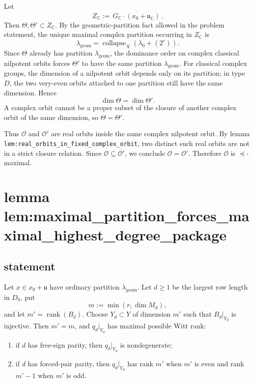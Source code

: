 \documentclass[
]{article}
\providecommand{\tightlist}{%
  \setlength{\itemsep}{0pt}\setlength{\parskip}{0pt}}
\begin{document}
Let \[
Z_{\mathbb C}:=\overline{\,G_{\mathbb C}\cdot(x_0+\mathfrak u_{\mathbb C})\,}.
\] Then \(\Theta,\Theta'\subset Z_{\mathbb C}\). By the
geometric-partition fact allowed in the problem statement, the unique
maximal complex partition occurring in \(Z_{\mathbb C}\) is \[
\lambda_{\mathrm{geom}}=\operatorname{collapse}_X(\lambda_0+(2^r)).
\] Since \(\Theta\) already has partition \(\lambda_{\mathrm{geom}}\),
the dominance order on complex classical nilpotent orbits forces
\(\Theta'\) to have the same partition \(\lambda_{\mathrm{geom}}\). For
classical complex groups, the dimension of a nilpotent orbit depends
only on its partition; in type \(D\), the two very-even orbits attached
to one partition still have the same dimension. Hence \[
\dim \Theta=\dim \Theta'.
\] A complex orbit cannot be a proper subset of the closure of another
complex orbit of the same dimension, so \(\Theta=\Theta'\).

Thus \(\mathcal O\) and \(\mathcal O'\) are real orbits inside the same
complex nilpotent orbit. By lemma
\texttt{lem:real\_orbits\_in\_fixed\_complex\_orbit}, two distinct such
real orbits are not in a strict closure relation. Since
\(\mathcal O\subseteq \overline{\mathcal O'}\), we conclude
\(\mathcal O=\mathcal O'\). Therefore \(\mathcal O\) is
\(\preceq\)-maximal.

\section{lemma
lem:maximal\_partition\_forces\_maximal\_highest\_degree\_package}\label{lemma-lemmaximal_partition_forces_maximal_highest_degree_package}

\subsection{statement}\label{statement-23}

Let \(x\in x_0+\mathfrak u\) have ordinary partition
\(\lambda_{\mathrm{geom}}\). Let \(d\ge 1\) be the largest row length in
\(D_0\), put \[
m:=\min(r,\dim M_d),
\] and let \(m'=\operatorname{rank}(B_d)\). Choose \(Y_d\subset Y\) of
dimension \(m'\) such that \(B_d|_{Y_d}\) is injective. Then \(m'=m\),
and \(q_d|_{Y_d}\) has maximal possible Witt rank:

\begin{enumerate}
\def\labelenumi{\arabic{enumi}.}
\tightlist
\item
  if \(d\) has free-sign parity, then \(q_d|_{Y_d}\) is nondegenerate;
\item
  if \(d\) has forced-pair parity, then \(q_d|_{Y_d}\) has rank \(m'\)
  when \(m'\) is even and rank \(m'-1\) when \(m'\) is odd.
\end{enumerate}
\end{document}
